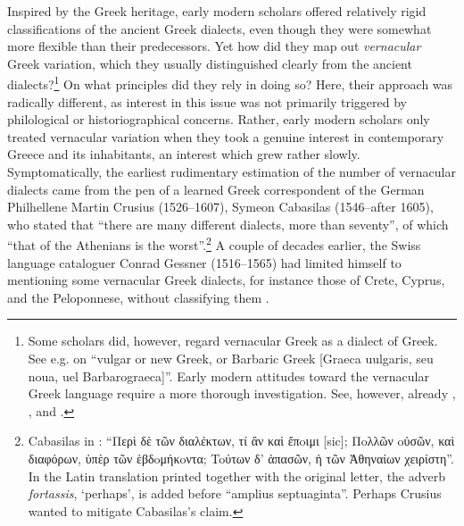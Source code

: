 {Inspired by the Greek heritage, early modern scholars offered relatively rigid classifications of the ancient Greek dialects, even though they were somewhat more flexible than their predecessors. Yet how did they map out \textit{vernacular} Greek variation, which they usually distinguished clearly from the ancient dialects?\footnote{Some scholars did, however, regard vernacular Greek as a dialect of Greek. See e.g. \citet[.7\textsc{\textsuperscript{v}}]{Megiser1603} on “vulgar or new Greek, or Barbaric Greek [Graeca uulgaris, seu noua, uel Barbarograeca]”. Early modern attitudes toward the vernacular Greek language require a more thorough investigation. See, however, already \citet{Caratzas1952}, \citet{Rotolo1973}, and \citet{Toufexis2005}.} On what principles did they rely in doing so? Here, their approach was radically different, as interest in this issue was not primarily triggered by philological or historiographical concerns. Rather, early modern scholars only treated vernacular variation when they took a genuine interest in contemporary Greece and its inhabitants, an interest which grew rather slowly. Symptomatically, the earliest rudimentary estimation of the number of vernacular dialects came from the pen of a learned Greek correspondent of the German Philhellene Martin Crusius (1526–1607), Symeon Cabasilas (1546–after 1605), who stated that “there are many different dialects, more than seventy”, of which “that of the Athenians is the worst”.\footnote{Cabasilas in \citet[461]{Crusius1584}: “Περὶ δὲ τῶν διαλέκτων, τί ἂν καὶ ἔπoιμι [sic]; Πoλλῶν oὐσῶν, καὶ διαφόρων, ὑπὲρ τῶν ἑβδoμήκoντα; Toύτων δ' ἁπασῶν, ἡ τῶν Ἀθηναίων χειρίστη”. In the Latin translation printed together with the original letter, the adverb \textit{fortassis}, ‘perhaps’, is added before “amplius septuaginta”. Perhaps Crusius wanted to mitigate Cabasilas’s claim.} A couple of decades earlier, the Swiss language cataloguer Conrad Gessner (1516–1565) had limited himself to mentioning some vernacular Greek dialects, for instance those of Crete, Cyprus, and the Peloponnese, without classifying them \citep[47\textsc{\textsuperscript{r}}]{Gessner1555}.

}
